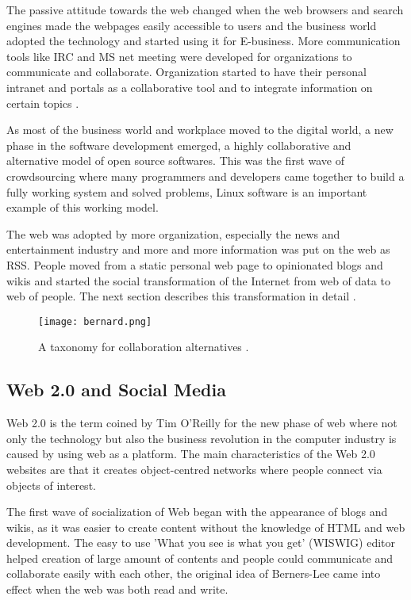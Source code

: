 The passive attitude towards the web changed when the web browsers and search engines made the webpages easily accessible to users and the business world adopted the technology and started using it for E-business. More communication tools like IRC and MS net meeting were developed for organizations to communicate and collaborate. Organization started to have their personal intranet and portals as a collaborative tool and to integrate information on certain topics \cite{stenmark2002information}.

As most of the business world and workplace moved to the digital world, a new phase in the software development emerged, a highly collaborative and alternative model of open source softwares. This was the first wave of crowdsourcing where many programmers and developers came together to build a fully working system and solved problems, Linux software is an important example of this working model.

The web was adopted by more organization, especially the news and entertainment industry and more and more information was put on the web as RSS. People moved from a static personal web page to opinionated blogs and wikis and started the social transformation of the Internet from web of data to web of people. The next section describes this transformation in detail \cite{Albors2008}.


\begin{figure}[!htb]
  \centering
  \texttt{[image: bernard.png]}
  \caption{A taxonomy for collaboration alternatives \cite{Albors2008}.}
  \label{Figure:figex2c}
\end{figure}


\subsection{Web 2.0 and Social Media}

Web 2.0 is the term coined by Tim O'Reilly for the new phase of web where not only the technology but also the business revolution in the computer industry is caused by using web as a platform. The main characteristics of the Web 2.0 websites are that it creates object-centred networks where people connect via objects of interest.

The first wave of socialization of Web began with the appearance of blogs and wikis, as it was easier to create content without the knowledge of HTML and web development. The easy to use 'What you see is what you get' (WISWIG) editor helped creation of large amount of contents and people could communicate and collaborate easily with each other, the original idea of Berners-Lee came into effect when the web was both read and write.


